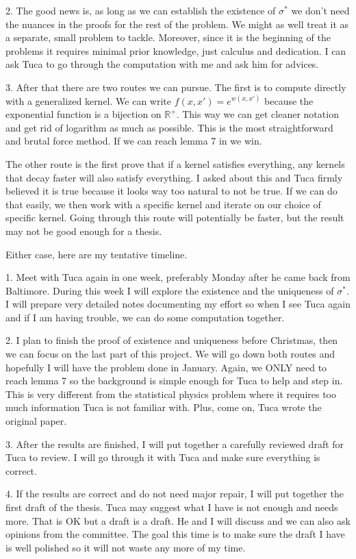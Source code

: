 \documentclass[10pt]{article}
\newenvironment{Proof of lemma}{\noindent{\bf Proof of Lemma}}{\hfill$\Box$\newline}
\newenvironment{Proof of claim}{\noindent{\bf Proof of claim}}{\hfill$\Box$\newline}
\newenvironment{Proof of theorem}{\noindent{\bf Proof of Theorem}}{\hfill\scriptsize{$\Box$}\newline}
\newenvironment{Proof of theorems}{\noindent{\bf Proof of Theorems}}{\hfill$\Box$\newline}
\newenvironment{Proof of proposition}{\noindent{\bf Proof of Proposition}}{\hfill$\Box$\newline}
\newenvironment{Proof of propositions}{\noindent{\bf Proof of Propositions}}{\hfill$\Box$\newline}
\newenvironment{Proof of exercise}{\noindent{\it Proof of Exercise:}}{\hfill$\Box$}
\numberwithin{equation}{section}
\begin{document}
2. The good news is, as long as we can establish the existence of $\sigma^*$ we don't need the nuances in the proofs for the rest of the problem. We might as well treat it as a separate, small problem to tackle. Moreover, since it is the beginning of the problems it requires minimal prior knowledge, just calculus and dedication. I can ask Tuca to go through the computation with me and ask him for advices.

3. After that there are two routes we can pursue. The first is to compute directly with a generalized kernel. We can write $f(x,x')=e^{w(x,x')}$ because the exponential function is a bijection on $\mathbb{R}^+$. This way we can get cleaner notation and get rid of logarithm as much as possible. This is the most straightforward and brutal force method. If we can reach lemma 7 in \cite{auffinger-tsne} we win.

The other route is the first prove that if a kernel satisfies everything, any
kernels that decay faster will also satisfy everything. I asked about this and
Tuca firmly believed it is true because it looks way too natural to not be
true. If we can do that easily, we then work with a specific kernel and iterate
on our choice of specific kernel. Going through this route will potentially be
faster, but the result may not be good enough for a thesis.

Either case, here are my tentative timeline.

1. Meet with Tuca again in one week, preferably Monday after he came back from Baltimore. During this week I will explore the existence and the uniqueness of $\sigma^*$. I will prepare very detailed notes documenting my effort so when I see Tuca again and if I am having trouble, we can do some computation together.

2. I plan to finish the proof of existence and uniqueness before Christmas, then we can focus on the last part of this project. We will go down both routes and hopefully I will have the problem done in January. Again, we ONLY need to reach lemma 7 so the background is simple enough for Tuca to help and step in. This is very different from the statistical physics problem where it requires too much information Tuca is not familiar with. Plus, come on, Tuca wrote the original paper.

3. After the results are finished, I will put together a carefully reviewed draft for Tuca to review. I will go through it with Tuca and make sure everything is correct.

4. If the results are correct and do not need major repair, I will put together the first draft of the thesis. Tuca may suggest what I have is not enough and needs more. That is OK but a draft is a draft. He and I will discuss and we can also ask opinions from the committee. The goal this time is to make sure the draft I have is well polished so it will not waste any more of my time.
\end{document}
